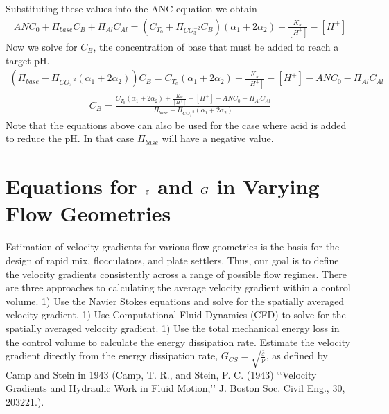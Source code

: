 \documentclass[letterpaper,10pt,english]{sphinxmanual}
\begin{document}
Substituting these values into the ANC equation we obtain
\begin{equation}\label{equation:Rapid_Mix/RM_Derivations:Rapid_Mix/RM_Derivations:19}
\begin{split}ANC_0 + \Pi_{base}C_B + \Pi_{Al}C_{Al} = ({C_{T_0}}+ \Pi_{CO_3^{-2}}C_B)({\alpha_1} + 2{\alpha_2}) +  \frac{{{K_w}}}{{\left[ {{H^ + }} \right]}} - \left[ {{H^ + }} \right]\end{split}
\end{equation}
Now we solve for \(C_B\), the concentration of base that must be added to reach a target pH.
\begin{equation}\label{equation:Rapid_Mix/RM_Derivations:Rapid_Mix/RM_Derivations:20}
\begin{split}(\Pi_{base} -\Pi_{CO_3^{-2}}({\alpha_1} + 2{\alpha_2}) )C_B= {C_{T_0}}({\alpha_1} + 2{\alpha_2}) +  \frac{{{K_w}}}{{\left[ {{H^ + }} \right]}} - \left[ {{H^ + }} \right] - ANC_0 - \Pi_{Al}C_{Al}\end{split}
\end{equation}\begin{equation}\label{equation:Rapid_Mix/RM_Derivations:Rapid_Mix/RM_Derivations:21}
\begin{split}C_B= \frac{{C_{T_0}}({\alpha_1} + 2{\alpha_2}) +  \frac{{{K_w}}}{{\left[ {{H^ + }} \right]}} - \left[ {{H^ + }} \right] - ANC_0 - \Pi_{Al}C_{Al}}{\Pi_{base} -\Pi_{CO_3^{-2}}({\alpha_1} + 2{\alpha_2})}\end{split}
\end{equation}
Note that the equations above can also be used for the case where acid is added to reduce the pH. In that case \(\Pi_{base}\) will have a negative value.


\section{Equations for \protect\(\varepsilon\protect\) and \protect\(G\protect\) in Varying Flow Geometries}
\label{\detokenize{Rapid_Mix/RM_Derivations:equations-for-and-in-varying-flow-geometries}}\label{\detokenize{Rapid_Mix/RM_Derivations:heading-equations-varying-flow-geometries}}
Estimation of velocity gradients for various flow geometries is the basis for the design of rapid mix, flocculators, and plate settlers. Thus, our goal is to define the velocity gradients consistently across a range of possible flow regimes. There are three approaches to calculating the average velocity gradient within a control volume. 1) Use the Navier Stokes equations and solve for the spatially averaged velocity gradient. 1) Use Computational Fluid Dynamics (CFD) to solve for the spatially averaged velocity gradient. 1) Use the total mechanical energy loss in the control volume to calculate the energy dissipation rate. Estimate the velocity gradient directly from the energy dissipation rate, \(G_{CS} = \sqrt{\frac{\bar\varepsilon}{\nu}}\), as defined by Camp and Stein in 1943 (Camp, T. R., and Stein, P. C. (1943) ‘‘Velocity Gradients and Hydraulic Work in Fluid Motion,’’ J. Boston Soc. Civil Eng., 30, 203\textendash{}221.).
\end{document}
